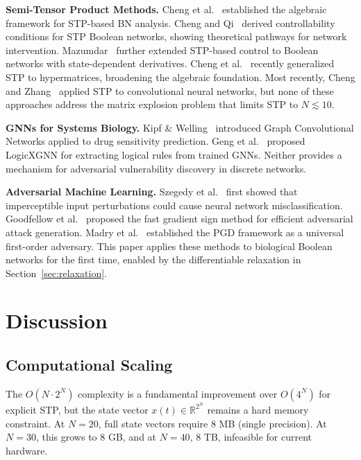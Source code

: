 \documentclass[11pt,a4paper]{article}
\begin{document}
\textbf{Semi-Tensor Product Methods.} Cheng et al.~\cite{cheng2011analysis} established the algebraic framework for STP-based BN analysis. Cheng and Qi~\cite{cheng2010controllability} derived controllability conditions for STP Boolean networks, showing theoretical pathways for network intervention. Mazumdar~\cite{mazumdar2020control} further extended STP-based control to Boolean networks with state-dependent derivatives. Cheng et al.~\cite{cheng2023hypermatrices} recently generalized STP to hypermatrices, broadening the algebraic foundation. Most recently, Cheng and Zhang~\cite{cheng2025semi} applied STP to convolutional neural networks, but none of these approaches address the matrix explosion problem that limits STP to $N \lesssim 10$.

\textbf{GNNs for Systems Biology.} Kipf \& Welling~\cite{kipf2017semi} introduced Graph Convolutional Networks applied to drug sensitivity prediction. Geng et al.~\cite{geng2026logicxgnn} proposed LogicXGNN for extracting logical rules from trained GNNs. Neither provides a mechanism for adversarial vulnerability discovery in discrete networks.

\textbf{Adversarial Machine Learning.} Szegedy et al.~\cite{szegedy2014intriguing} first showed that imperceptible input perturbations could cause neural network misclassification. Goodfellow et al.~\cite{goodfellow2015explaining} proposed the fast gradient sign method for efficient adversarial attack generation. Madry et al.~\cite{madry2018towards} established the PGD framework as a universal first-order adversary. This paper applies these methods to biological Boolean networks for the first time, enabled by the differentiable relaxation in Section~\ref{sec:relaxation}.

\section{Discussion}
\label{sec:discussion}

\subsection{Computational Scaling}
\label{sec:scaling}

The $O(N \cdot 2^N)$ complexity is a fundamental improvement over $O(4^N)$ for explicit STP, but the state vector $x(t) \in \mathbb{R}^{2^N}$ remains a hard memory constraint. At $N=20$, full state vectors require 8 MB (single precision). At $N=30$, this grows to 8 GB, and at $N=40$, 8 TB, infeasible for current hardware.
\end{document}
